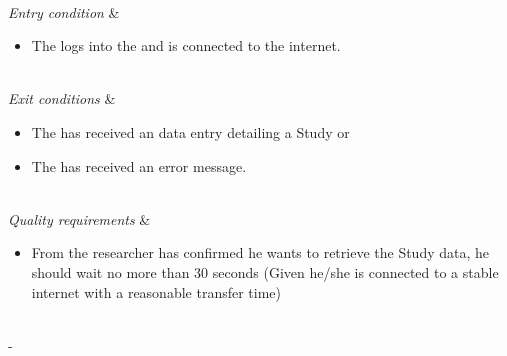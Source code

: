 \begin{table}[h!]
\begin{tabu}
\begin{enumerate}[leftmargin=*,topsep=0pt,itemsep=-1ex]
	\end{enumerate} \\
	\hline
	\textit{Entry condition} &
	\vspace{-3mm}
	\begin{itemize}[leftmargin=*,topsep=0pt,itemsep=-1ex]
		\item The \client logs into the \client and is connected to the internet.
	\end{itemize} \\
	\hline
	\textit{Exit conditions} &
	\vspace{-3mm}
	\begin{itemize}[leftmargin=*,topsep=0pt,itemsep=-1ex]
		\item The \client has received an data entry detailing a Study or
		\item The \client has received an error message.
	\end{itemize} \\
	\hline
	\textit{Quality \newline requirements} &
	\vspace{-3mm}
	\begin{itemize}[leftmargin=*,topsep=0pt,itemsep=-1ex]
		\item From the researcher has confirmed he wants to retrieve the Study data,  he should wait no more than 30 seconds (Given he/she is connected to a stable internet with a reasonable transfer time)
	\end{itemize} \\
	\tabucline[1.5pt]-
\end{tabu}
\caption{Use case: RetrieveStudyInformation}
\label{uc:RetrieveStudyInformation}
\end{table}